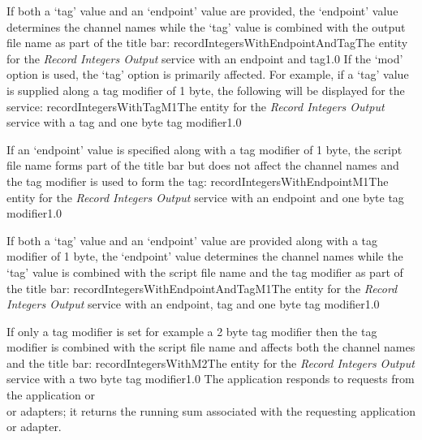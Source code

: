 If both a `tag' value and an `endpoint' value are provided, the `endpoint' value
determines the channel names while the `tag' value is combined with the output file name
as part of the title bar:
%
{recordIntegersWithEndpointAndTag}{The \emph{\MMMU} entity for the \emph{Record Integers
Output} service with an endpoint and tag}{1.0}
\condPage{}
If the `mod' option is used, the `tag' option is primarily affected.
For example, if a `tag' value is supplied along a tag modifier of 1 byte, the following
will be displayed for the service:
%
{recordIntegersWithTagM1}{The \emph{\MMMU} entity for the \emph{Record Integers Output}
service with a tag and one byte tag modifier}{1.0}

If an `endpoint' value is specified along with a tag modifier of 1 byte, the script file
name forms part of the title bar but does not affect the channel names and the tag
modifier is used to form the tag:
%
{recordIntegersWithEndpointM1}{The \emph{\MMMU} entity for the \emph{Record Integers
Output} service with an endpoint and one byte tag modifier}{1.0}

If both a `tag' value and an `endpoint' value are provided along with a tag modifier of 1
byte, the `endpoint' value determines the channel names while the `tag' value is combined
with the script file name and the tag modifier as part of the title bar:
%
{recordIntegersWithEndpointAndTagM1}{The \emph{\MMMU} entity for the \emph{Record Integers
Output} service with an endpoint, tag and one byte tag modifier}{1.0}

If only a tag modifier is set \longDash{} for example a 2 byte tag modifier \longDash{}
then the tag modifier is combined with the script file name and affects both the channel
names and the title bar:
%
{recordIntegersWithM2}{The \emph{\MMMU} entity for the \emph{Record Integers Output}
service with a two byte tag modifier}{1.0}
\condPage
{}
The  application responds to
requests from the  application or\\
 or
 adapters; it returns the running sum
associated with the requesting application or adapter.\\

